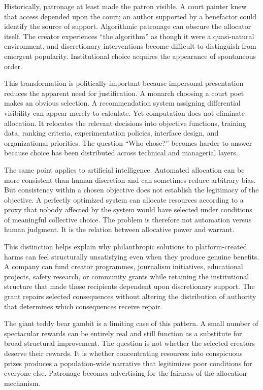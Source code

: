 \documentclass[11pt]{article}
\begin{document}
Historically, patronage at least made the patron visible. A court painter knew that access depended upon the court; an author supported by a benefactor could identify the source of support. Algorithmic patronage can obscure the allocator itself. The creator experiences ``the algorithm'' as though it were a quasi-natural environment, and discretionary interventions become difficult to distinguish from emergent popularity. Institutional choice acquires the appearance of spontaneous order.

This transformation is politically important because impersonal presentation reduces the apparent need for justification. A monarch choosing a court poet makes an obvious selection. A recommendation system assigning differential visibility can appear merely to calculate. Yet computation does not eliminate allocation. It relocates the relevant decisions into objective functions, training data, ranking criteria, experimentation policies, interface design, and organizational priorities. The question ``Who chose?'' becomes harder to answer because choice has been distributed across technical and managerial layers.

The same point applies to artificial intelligence. Automated allocation can be more consistent than human discretion and can sometimes reduce arbitrary bias. But consistency within a chosen objective does not establish the legitimacy of the objective. A perfectly optimized system can allocate resources according to a proxy that nobody affected by the system would have selected under conditions of meaningful collective choice. The problem is therefore not automation versus human judgment. It is the relation between allocative power and warrant.

This distinction helps explain why philanthropic solutions to platform-created harms can feel structurally unsatisfying even when they produce genuine benefits. A company can fund creator programmes, journalism initiatives, educational projects, safety research, or community grants while retaining the institutional structure that made those recipients dependent upon discretionary support. The grant repairs selected consequences without altering the distribution of authority that determines which consequences receive repair.

The giant teddy bear gambit is a limiting case of this pattern. A small number of spectacular rewards can be entirely real and still function as a substitute for broad structural improvement. The question is not whether the selected creators deserve their rewards. It is whether concentrating resources into conspicuous prizes produces a population-wide narrative that legitimizes poor conditions for everyone else. Patronage becomes advertising for the fairness of the allocation mechanism.
\end{document}
